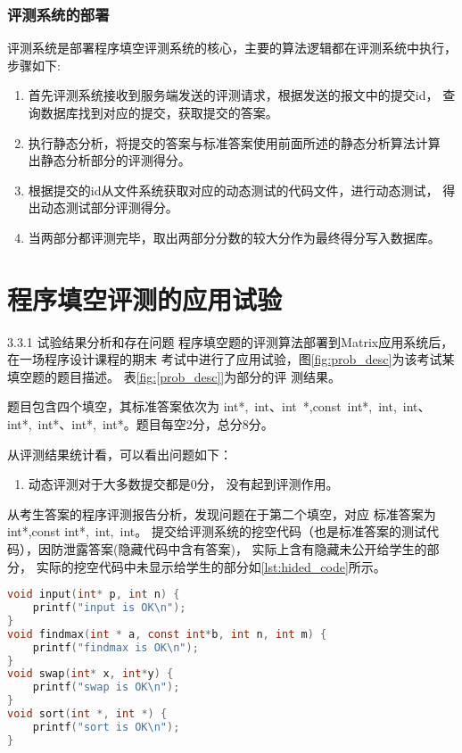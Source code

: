 \subsubsection{评测系统的部署}
评测系统是部署程序填空评测系统的核心，主要的算法逻辑都在评测系统中执行，步骤如下:
\begin{enumerate}
  \item 首先评测系统接收到服务端发送的评测请求，根据发送的报文中的提交id，
  查询数据库找到对应的提交，获取提交的答案。
  \item 执行静态分析，将提交的答案与标准答案使用前面所述的静态分析算法计算
  出静态分析部分的评测得分。
  \item 根据提交的id从文件系统获取对应的动态测试的代码文件，进行动态测试，
  得出动态测试部分评测得分。
  \item 当两部分都评测完毕，取出两部分分数的较大分作为最终得分写入数据库。
\end{enumerate}

\section{程序填空评测的应用试验}

3.3.1 试验结果分析和存在问题
程序填空题的评测算法部署到Matrix应用系统后，在一场程序设计课程的期末
考试中进行了应用试验，图\ref{fig:prob_desc}为该考试某填空题的题目描述。
表\ref{fig:[prob_desc]}为部分的评
测结果。

题目包含四个填空，其标准答案依次为 int*,\ int、int\ *,const\ int*,\ int,\ int、
int*,\ int*、int*,\ int*。题目每空2分，总分8分。




从评测结果统计看，可以看出问题如下：
\begin{enumerate}
  \item 动态评测对于大多数提交都是0分，
  没有起到评测作用。
\end{enumerate}

从考生答案的程序评测报告分析，发现问题在于第二个填空，对应
标准答案为 int*,const int*,\ int,\ int。
提交给评测系统的挖空代码（也是标准答案的测试代码），因防泄露答案(隐藏代码中含有答案)，
实际上含有隐藏未公开给学生的部分，
实际的挖空代码中未显示给学生的部分如\ref{lst:hided_code}所示。

\begin{lstlisting}[caption=执行代码中未显示的部分,label=lst:hided_code,language=C]
void input(int* p, int n) {
    printf("input is OK\n");
}
void findmax(int * a, const int*b, int n, int m) {
    printf("findmax is OK\n");
}
void swap(int* x, int*y) {
    printf("swap is OK\n");
}
void sort(int *, int *) {
    printf("sort is OK\n");
}
\end{lstlisting}

